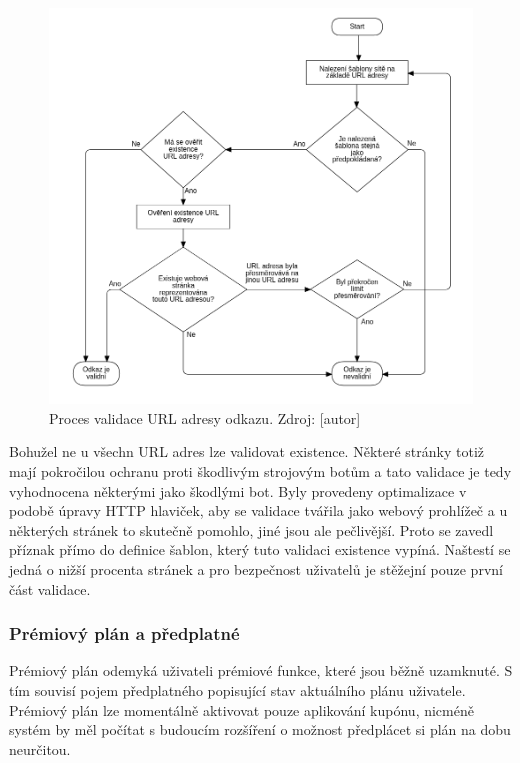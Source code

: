 			\begin{figure}[H]
				\centering
				\includegraphics[width=\linewidth]{obrazky/proces_validace_odkazu}\hfill
				\caption{Proces validace URL adresy odkazu. Zdroj: [autor]}
			\end{figure}

			Bohužel ne u všechn URL adres lze validovat existence.
			Některé stránky totiž mají pokročilou ochranu proti škodlivým strojovým botům a tato validace je tedy
			vyhodnocena některými jako škodlými bot.
			Byly provedeny optimalizace v podobě úpravy \ac{HTTP} hlaviček, aby se validace tvářila jako webový prohlížeč
			a u některých stránek to skutečně pomohlo, jiné jsou ale pečlivější.
			Proto se zavedl příznak přímo do definice šablon, který tuto validaci existence vypíná.
			Naštestí se jedná o nižší procenta stránek a pro bezpečnost uživatelů je stěžejní pouze první část validace.

		\subsubsection{Prémiový plán a předplatné}

		Prémiový plán odemyká uživateli prémiové funkce, které jsou běžně uzamknuté.
		S tím souvisí pojem předplatného popisující stav aktuálního plánu uživatele.
		Prémiový plán lze momentálně aktivovat pouze aplikování kupónu, nicméně systém by měl počítat s budoucím rozšíření
		o možnost předplácet si plán na dobu neurčitou.


